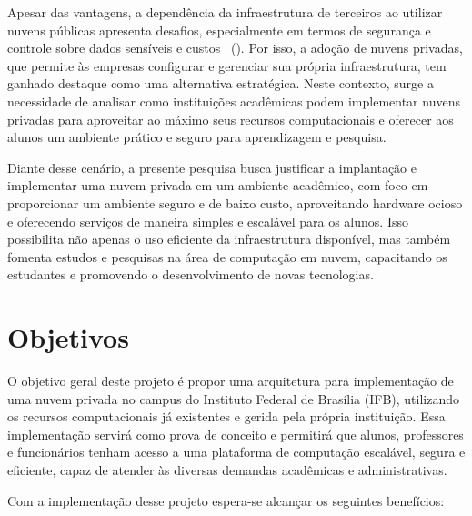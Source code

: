 Apesar das vantagens, a dependência da infraestrutura de terceiros ao utilizar nuvens públicas apresenta desafios, especialmente em termos de segurança e controle sobre dados sensíveis e custos ~(\cite{privateCloudAdvantagesDisadvantages}). Por isso, a adoção de nuvens privadas, que permite às empresas configurar e gerenciar sua própria infraestrutura, tem ganhado destaque como uma alternativa estratégica. Neste contexto, surge a necessidade de analisar como instituições acadêmicas podem implementar nuvens privadas para aproveitar ao máximo seus recursos computacionais e oferecer aos alunos um ambiente prático e seguro para aprendizagem e pesquisa.

Diante desse cenário, a presente pesquisa busca justificar a implantação e implementar uma nuvem privada em um ambiente acadêmico, com foco em proporcionar um ambiente seguro e de baixo custo, aproveitando hardware ocioso e oferecendo serviços de maneira simples e escalável para os alunos. Isso possibilita não apenas o uso eficiente da infraestrutura disponível, mas também fomenta estudos e pesquisas na área de computação em nuvem, capacitando os estudantes e promovendo o desenvolvimento de novas tecnologias.

\section{Objetivos}

O objetivo geral deste projeto é propor uma arquitetura para implementação de uma nuvem privada no campus do Instituto Federal de Brasília (IFB), utilizando os recursos computacionais já existentes e gerida pela própria instituição. Essa implementação servirá como prova de conceito e permitirá que alunos, professores e funcionários tenham acesso a uma plataforma de computação escalável, segura e eficiente, capaz de atender às diversas demandas acadêmicas e administrativas.

Com a implementação desse projeto espera-se alcançar os seguintes benefícios:


